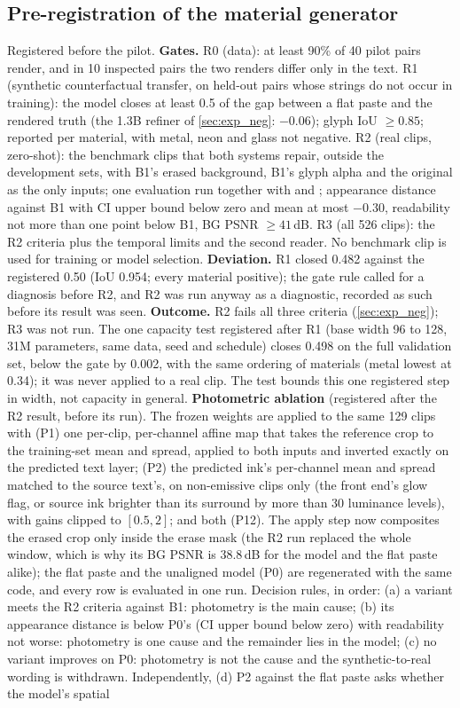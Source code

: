 \subsection{Pre-registration of the material generator}
\label{sec:supp_prereg_matgen}
Registered before the pilot. \textbf{Gates.} R0 (data): at least 90\% of 40 pilot pairs render, and in 10 inspected pairs the two renders differ only in the text. R1 (synthetic counterfactual transfer, on held-out pairs whose strings do not occur in training): the model closes at least 0.5 of the gap between a flat paste and the rendered truth (the 1.3B refiner of \cref{sec:exp_neg}: $-0.06$); glyph IoU $\geq 0.85$; reported per material, with metal, neon and glass not negative. R2 (real clips, zero-shot): the benchmark clips that both systems repair, outside the development sets, with B1's erased background, B1's glyph alpha and the original as the only inputs; one evaluation run together with \method and \steer; appearance distance against B1 with CI upper bound below zero and mean at most $-0.30$, readability not more than one point below B1, BG PSNR $\geq 41$\,dB. R3 (all 526 clips): the R2 criteria plus the temporal limits and the second reader. No benchmark clip is used for training or model selection. \textbf{Deviation.} R1 closed 0.482 against the registered 0.50 (IoU 0.954; every material positive); the gate rule called for a diagnosis before R2, and R2 was run anyway as a diagnostic, recorded as such before its result was seen. \textbf{Outcome.} R2 fails all three criteria (\cref{sec:exp_neg}); R3 was not run. The one capacity test registered after R1 (base width 96 to 128, 31M parameters, same data, seed and schedule) closes 0.498 on the full validation set, below the gate by 0.002, with the same ordering of materials (metal lowest at 0.34); it was never applied to a real clip. The test bounds this one registered step in width, not capacity in general. \textbf{Photometric ablation} (registered after the R2 result, before its run). The frozen weights are applied to the same 129 clips with (P1) one per-clip, per-channel affine map that takes the reference crop to the training-set mean and spread, applied to both inputs and inverted exactly on the predicted text layer; (P2) the predicted ink's per-channel mean and spread matched to the source text's, on non-emissive clips only (the front end's glow flag, or source ink brighter than its surround by more than 30 luminance levels), with gains clipped to $[0.5, 2]$; and both (P12). The apply step now composites the erased crop only inside the erase mask (the R2 run replaced the whole window, which is why its BG PSNR is 38.8\,dB for the model and the flat paste alike); the flat paste and the unaligned model (P0) are regenerated with the same code, and every row is evaluated in one run. Decision rules, in order: (a) a variant meets the R2 criteria against B1: photometry is the main cause; (b) its appearance distance is below P0's (CI upper bound below zero) with readability not worse: photometry is one cause and the remainder lies in the model; (c) no variant improves on P0: photometry is not the cause and the synthetic-to-real wording is withdrawn. Independently, (d) P2 against the flat paste asks whether the model's spatial 